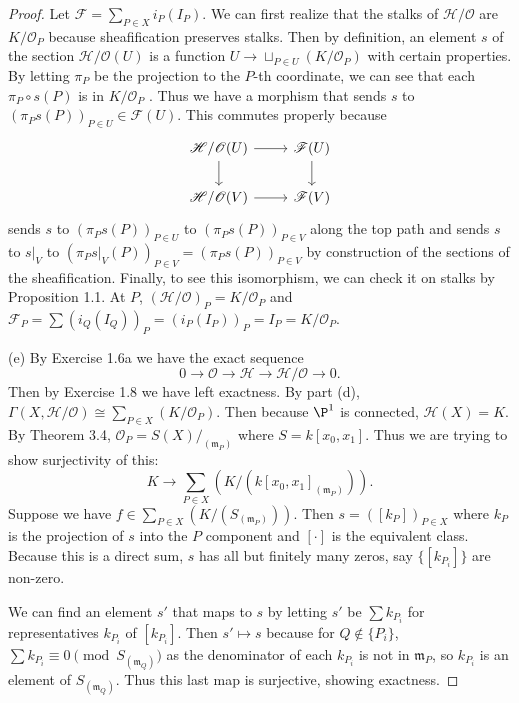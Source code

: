 \begin{proof}
	Let $\mathscr{F} = \sum_{P\in X}i_P(I_P) $.
	We can first realize that the stalks of $\mathscr{H} / \mathscr{O} $ are $K / \mathscr{O}_P$ because sheafification preserves stalks.
	Then by definition, an element $s $ of the section $\mathscr{H} / \mathscr{O} (U)$ is a function $U \to \sqcup_{P\in U} (K / \mathscr{O}_P)$ with certain properties.
	By letting $\pi _P $ be the projection to the $P $-th coordinate, we can see that each $\pi_P\circ s (P)$ is in $K / \mathscr{O}_P $ .
	Thus we have a morphism that sends $s $ to $(\pi_Ps(P))_{P\in U} \in \mathscr{F}(U) $.
	This commutes properly because
	\[
	\begin{tikzcd}
	\mathscr{H} / \mathscr{O}(U) & \mathscr{F}(U)\\
	\mathscr{H} / \mathscr{O}(V) & \mathscr{F}(V)
	\arrow[from=1-1,to=1-2]
	\arrow[from=1-1,to=2-1]
	\arrow[from=2-1,to=2-2]
	\arrow[from=1-2,to=2-2]
	\end{tikzcd}
	\]
	sends $s $ to $(\pi _Ps(P))_{P\in U}$ to $(\pi _Ps(P))_{P \in V} $ along the top path and sends $s $ to $s|_V $ to $(\pi _Ps|_V(P))_{P \in V} = (\pi _Ps(P))_{P\in V} $ by construction of the sections of the sheafification.
	Finally, to see this isomorphism, we can check it on stalks by Proposition 1.1.
	At $P $, $(\mathscr{H} / \mathscr{O})_P = K / \mathscr{O}_P$ and $\mathscr{F}_P = \sum (i_Q(I_Q))_P = (i_P(I_P))_P = I_P = K / \mathscr{O}_P$.

	(e) 
	By Exercise 1.6a we have the exact sequence
	\[
		0 \to \mathscr{O} \to \mathscr{H} \to \mathscr{H} / \mathscr{O} \to 0
	.\] 
	Then by Exercise 1.8 we have left exactness.
	By part (d), $\Gamma(X,\mathscr{H} / \mathscr{O}) \cong \sum_{P \in X} (K / \mathscr{O}_P)$.
	Then because $\P^1 $ is connected, $\mathscr{H}(X) = K $.
	By Theorem 3.4, $\mathscr{O}_P = S(X) /_{(\mathfrak{m}_P)} $ where $S = k[x_{0},x_{1}] $.
	Thus we are trying to show surjectivity of this:
	\[
		K \to \sum_{P \in X} (K / (k[x_{0},x_{1}]_{(\mathfrak{m}_P)}))
	.\] 
	Suppose we have $f \in \sum_{P \in X} (K / (S_{(\mathfrak{m}_P)})) $.
	Then $s = ([k_P])_{P\in X}$ where $k_P $ is the projection of $s $ into the $P $ component and $[\cdot] $ is the equivalent class.
	Because this is a direct sum, $s $ has all but finitely many zeros, say $\{[k_{P_i}]\} $ are non-zero.

	We can find an element $s' $ that maps to $s $ by letting $s' $ be $\sum k_{P_i} $ for representatives $k_{P_i} $ of $[k_{P_i}] $.
	Then $s' \mapsto s $ because for $Q \notin \{P_i\}   $, $\sum k_{P_i} \equiv 0 \pmod{S_{(\mathfrak{m}_Q)}}$ as the denominator of each $k_{P_i} $ is not in $\mathfrak{m}_P $, so $k_{P_i} $ is an element of $S_{(\mathfrak{m}_Q)} $.
	Thus this last map is surjective, showing exactness.
\end{proof}

